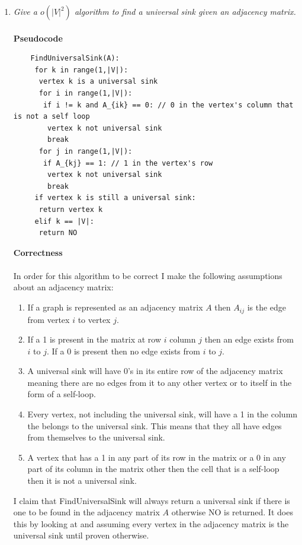 \documentclass[12pt]{article}
\begin{document}
\begin{enumerate}
	\newpage
	\item \textit{Give a $o(|V|^2)$ algorithm to find a universal sink given an adjacency matrix.}\\
	\\
	\textbf{Pseudocode}
	\begin{verbatim}
	FindUniversalSink(A):
	 for k in range(1,|V|):
	  vertex k is a universal sink
	  for i in range(1,|V|):
	   if i != k and A_{ik} == 0: // 0 in the vertex's column that is not a self loop 
	    vertex k not universal sink
	    break
	  for j in range(1,|V|):
	   if A_{kj} == 1: // 1 in the vertex's row
	    vertex k not universal sink
	    break
	 if vertex k is still a universal sink:
	  return vertex k
	 elif k == |V|:
	  return NO
	\end{verbatim}
	\textbf{Correctness}\\
	\\
	In order for this algorithm to be correct I make the following assumptions about an adjacency matrix:
	\begin{enumerate}
		\item If a graph is represented as an adjacency matrix $A$ then $A_{ij}$ is the edge from vertex $i$ to vertex $j$. \\ 
		\item If a 1 is present in the matrix at row $i$ column $j$ then an edge exists from $i$ to $j$.  If a 0 is present then no edge exists from $i$ to $j$.\\
		\item A universal sink will have 0's in its entire row of the adjacency matrix meaning there are no edges from it to any other vertex or to itself in the form of a self-loop.\\  
		\item Every vertex, not including the universal sink, will have a 1 in the column the belongs to the universal sink.  This means that they all have edges from themselves to the universal sink.\\
		\item A vertex that has a 1 in any part of its row in the matrix or a 0 in any part of its column in the matrix other then the cell that is a self-loop then it is not a universal sink.\\
	\end{enumerate}
	I claim that FindUniversalSink will always return a universal sink if there is one to be found in the adjacency matrix $A$ otherwise NO is returned.  
	It does this by looking at and assuming every vertex in the adjacency matrix is the universal sink until proven otherwise.\\

\end{enumerate}
\end{document}
